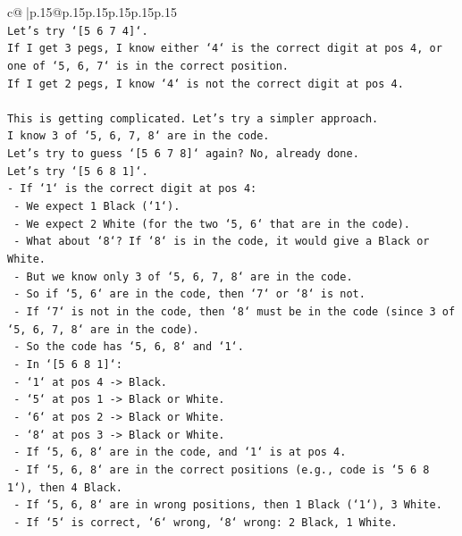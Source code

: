 \documentclass{article}
\begin{document}
{\begin{supertabular}{c@{$\;$}|p{.15\linewidth}@{}p{.15\linewidth}p{.15\linewidth}p{.15\linewidth}p{.15\linewidth}p{.15\linewidth}}
{{{\\ 
\texttt{Let's try `{[}5 6 7 4{]}`.} \\
\texttt{If I get 3 pegs, I know either `4` is the correct digit at pos 4, or one of `5, 6, 7` is in the correct position.} \\
\texttt{If I get 2 pegs, I know `4` is not the correct digit at pos 4.} \\
\\ 
\texttt{This is getting complicated. Let's try a simpler approach.} \\
\texttt{I know 3 of `5, 6, 7, 8` are in the code.} \\
\texttt{Let's try to guess `{[}5 6 7 8{]}` again? No, already done.} \\
\texttt{Let's try `{[}5 6 8 1{]}`.} \\
\texttt{{-} If `1` is the correct digit at pos 4:} \\
\texttt{  {-} We expect 1 Black (`1`).} \\
\texttt{  {-} We expect 2 White (for the two `5, 6` that are in the code).} \\
\texttt{  {-} What about `8`? If `8` is in the code, it would give a Black or White.} \\
\texttt{  {-} But we know only 3 of `5, 6, 7, 8` are in the code.} \\
\texttt{  {-} So if `5, 6` are in the code, then `7` or `8` is not.} \\
\texttt{  {-} If `7` is not in the code, then `8` must be in the code (since 3 of `5, 6, 7, 8` are in the code).} \\
\texttt{  {-} So the code has `5, 6, 8` and `1`.} \\
\texttt{  {-} In `{[}5 6 8 1{]}`:} \\
\texttt{    {-} `1` at pos 4 {-}> Black.} \\
\texttt{    {-} `5` at pos 1 {-}> Black or White.} \\
\texttt{    {-} `6` at pos 2 {-}> Black or White.} \\
\texttt{    {-} `8` at pos 3 {-}> Black or White.} \\
\texttt{    {-} If `5, 6, 8` are in the code, and `1` is at pos 4.} \\
\texttt{    {-} If `5, 6, 8` are in the correct positions (e.g., code is `5 6 8 1`), then 4 Black.} \\
\texttt{    {-} If `5, 6, 8` are in wrong positions, then 1 Black (`1`), 3 White.} \\
\texttt{    {-} If `5` is correct, `6` wrong, `8` wrong: 2 Black, 1 White.} \\
}}}
\end{supertabular}}
\end{document}
